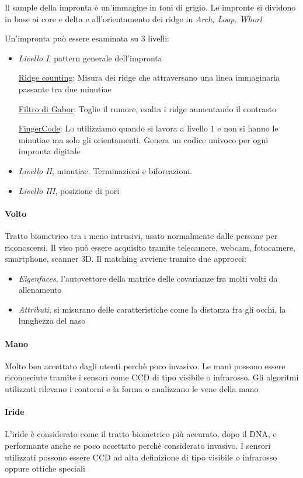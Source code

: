 Il sample della impronta è un'immagine in toni di grigio. Le impronte si dividono in base ai core e delta e all'orientamento dei ridge in \textit{Arch, Loop, Whorl}

Un'impronta può essere esaminata su $3$ livelli:
\begin{itemize}
    \item \textit{Livello I}, pattern generale dell’impronta 
    
    \uline{Ridge counting}: Misura dei ridge che attraversano una linea immaginaria passante tra due minutiae

    \uline{Filtro di Gabor}: Toglie il rumore, esalta i ridge aumentando il contrasto

    \uline{FingerCode}: Lo utilizziamo quando si lavora a livello $1$ e non si hanno le minutiae ma solo gli orientamenti. Genera un codice univoco per ogni impronta digitale
    
    \item \textit{Livello II}, minutiae. Terminazioni e biforcazioni.
    \item \textit{Livello III}, posizione di pori
\end{itemize}

\paragraph{Volto}
Tratto biometrico tra i meno intrusivi, usato normalmente dalle persone per riconoscersi. Il viso può essere acquisito tramite telecamere, webcam, fotocamere, smartphone, scanner 3D. Il matching avviene tramite due approcci:
\begin{itemize}
    \item \textit{Eigenfaces}, l'autovettore della matrice delle covarianze fra molti volti da allenamento
    \item \textit{Attributi}, si misurano delle caratteristiche come la distanza fra gli occhi, la lunghezza del naso
\end{itemize}

\paragraph{Mano}
Molto ben accettato dagli utenti perchè poco invasivo. Le mani possono essere riconosciute tramite i sensori come CCD di tipo visibile o infrarosso. Gli algoritmi utilizzati rilevano i contorni e la forma o analizzano le vene della mano

\paragraph{Iride}
L’iride è considerato come il tratto biometrico più accurato, dopo il DNA, e performante anche se poco accettato perchè considerato invasivo. I sensori utilizzati possono essere CCD ad alta definizione di tipo visibile o infrarosso oppure ottiche speciali

